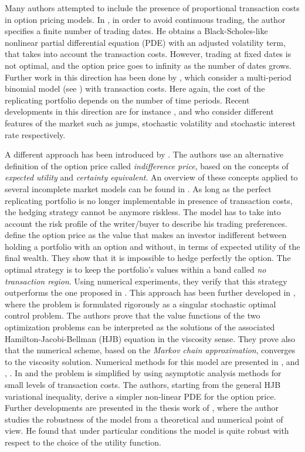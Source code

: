 Many authors attempted to include the presence of proportional transaction costs in option pricing models.
In \cite{Le85}, in order to avoid continuous trading, the author specifies 
a finite number of trading dates. He obtains a Black-Scholes-like
nonlinear partial differential equation (PDE) with an adjusted volatility term, that takes into account the transaction costs. 
However, trading at fixed dates is not optimal, and the option price goes to infinity as the number of dates grows.
Further work in this direction has been done by \cite{BoVo92}, which consider a multi-period binomial model (see \cite{CRR79})
with transaction costs. Here again, the cost of the replicating portfolio depends on the number of time periods. 
Recent developments in this direction are for instance \cite{Mocio07}, \cite{FlMaSe14} and \cite{Sengu14} 
who consider different features of the market such as jumps, stochastic volatility and stochastic interest rate respectively.  

A different approach has been introduced by \cite{HoNe89}. The authors use an alternative definition of the option price
called \emph{indifference price}, based on the concepts of \emph{expected utility} and \emph{certainty equivalent}.  
An overview of these concepts applied to several incomplete market models can be found in \cite{Carmona}.
As long as the perfect replicating portfolio is no longer implementable in presence of transaction costs, the 
hedging strategy cannot be anymore riskless. 
The model has to take into account the risk profile of the writer/buyer to describe his trading preferences.
\cite{HoNe89} define the option price as the value that makes an investor indifferent between holding a portfolio with an option
and without, in terms of expected utility of the final wealth.
They show that it is impossible to hedge perfectly the option. The optimal strategy is to keep the portfolio's values within
a band called \emph{no transaction region}. Using numerical experiments, they verify that this strategy outperforms the one 
proposed in \cite{Le85}.
This approach has been further developed in \cite{DaPaZa93}, where the problem is formulated rigorously as a singular 
stochastic optimal control problem. The authors prove that the value functions of the two optimization problems
can be interpreted as the solutions of the associated Hamilton-Jacobi-Bellman (HJB) equation in the viscosity sense. 
They prove also that the numerical scheme, based on the \emph{Markov chain approximation}, converges to the viscosity solution.
Numerical methods for this model are presented in \cite{DaPa94}, \cite{ClHo97} and \cite{Mon03}, \cite{Mon04}.
In \cite{WhWi97} and \cite{BaSo98} the problem is simplified by using asymptotic analysis methods for small levels of 
transaction costs. The authors, starting from the general HJB variational inequality, derive a simpler non-linear PDE for the option price. 
Further developments are presented in the thesis work of \cite{Damgaard}, where the author 
studies the robustness of the model from a theoretical and numerical point of view. 
He found that under particular conditions the model is quite robust with respect to the choice of the utility function. 

